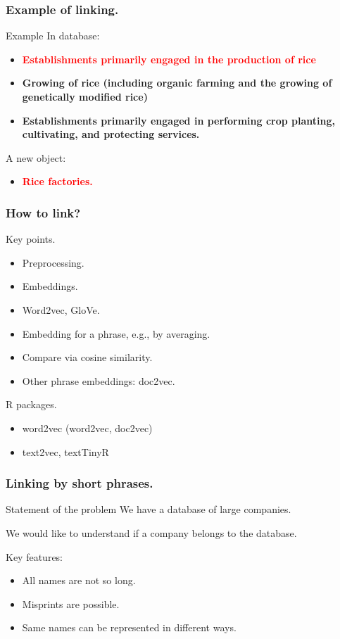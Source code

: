 \documentclass{beamer}
\begin{document}
\begin{frame}[fragile]
\frametitle{Example of linking.}
\begin{block}{Example}
In database:
\begin{itemize}
\item \textcolor{red}{\textbf{Establishments primarily engaged in the production of rice}}

\item \textbf{Growing of rice (including organic farming and the growing of genetically modified rice)}

\item \textbf{Establishments primarily engaged in performing crop planting, cultivating, and protecting services.}

\end{itemize}
A new object:
\begin{itemize}
\item \textcolor{red}{\textbf{Rice factories.}}
\end{itemize}
\end{block}
\end{frame}
\begin{frame}[fragile]
\frametitle{How to link?}
\begin{block}{Key points.}
\begin{itemize}
  \item Preprocessing.
	\item Embeddings.
	\item Word2vec, GloVe.
	\item Embedding for a phrase, e.g., by averaging.
	\item Compare via cosine similarity.
	\item Other phrase embeddings: doc2vec.
\end{itemize}
\end{block}
\begin{block}{R packages.}
\begin{itemize}
\item word2vec (word2vec, doc2vec)
\item text2vec, textTinyR
\end{itemize}
\end{block}
\end{frame}

\begin{frame}
\frametitle{Linking by short phrases.}
\begin{block}{Statement of the problem}
We have a database of large companies.

We would like to understand if a company belongs to the database.
\end{block}
\begin{block}{Key features:}
\begin{itemize}
	\item All names are not so long.
	\item Misprints are possible.
	\item Same names can be represented in different ways.
\end{itemize}
\end{block}
\end{frame}
\end{document}
